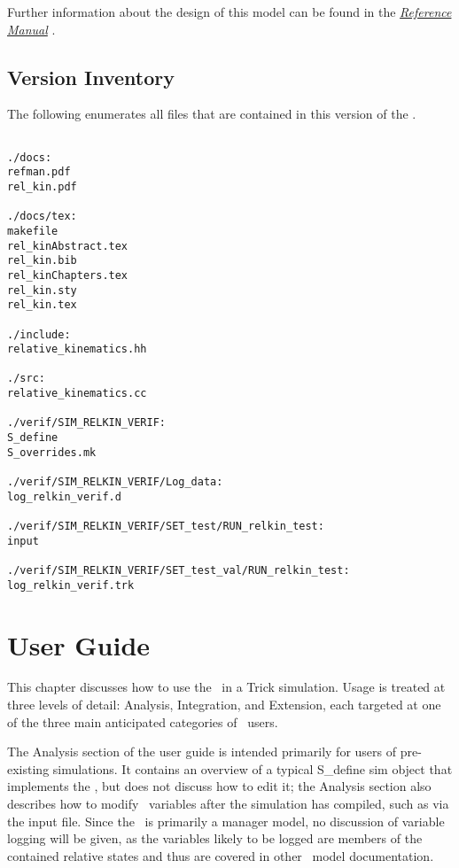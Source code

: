 Further information about the design of this model can be found
in the  \href{file:refman.pdf} {\em Reference Manual}
\cite{rel_kinbib:ReferenceManual}.


\section{Version Inventory}

The following enumerates all files that are contained in this version
of the \relkinDesc.

\begin{verbatim}

./docs:
refman.pdf
rel_kin.pdf

./docs/tex:
makefile
rel_kinAbstract.tex
rel_kin.bib
rel_kinChapters.tex
rel_kin.sty
rel_kin.tex

./include:
relative_kinematics.hh

./src:
relative_kinematics.cc

./verif/SIM_RELKIN_VERIF:
S_define
S_overrides.mk

./verif/SIM_RELKIN_VERIF/Log_data:
log_relkin_verif.d

./verif/SIM_RELKIN_VERIF/SET_test/RUN_relkin_test:
input

./verif/SIM_RELKIN_VERIF/SET_test_val/RUN_relkin_test:
log_relkin_verif.trk

\end{verbatim}



\chapter{User Guide}\label{ch:user}
This chapter discusses how to use the \relkinDesc\ in a Trick simulation. Usage
is treated at three levels of detail: Analysis, Integration, and Extension,
each targeted at one of the three main anticipated categories of \JEODid\ users.

The Analysis section of the user guide is intended primarily for users of
pre-existing simulations. It contains an overview of a typical S\_define sim
object that implements the \relkinDesc, but does not discuss how to edit it;
the Analysis section also describes how to modify \relkinDesc\ variables after
the simulation has compiled, such as via the input file. Since the \relkinDesc\
is primarily a manager model, no discussion of variable logging will be
given, as the variables likely to be logged are members of the contained
relative states and thus are covered in other \JEODid\ model documentation.

